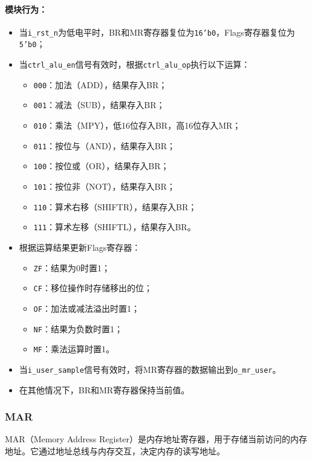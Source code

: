 \documentclass[lang=cn,a4paper,newtx]{elegantpaper}
\begin{document}
\paragraph{模块行为：}
\begin{itemize}
  \item 当\texttt{i\_rst\_n}为低电平时，BR和MR寄存器复位为\texttt{16'b0}，Flags寄存器复位为\texttt{5'b0}；
  \item 当\texttt{ctrl\_alu\_en}信号有效时，根据\texttt{ctrl\_alu\_op}执行以下运算：
    \begin{itemize}
      \item \texttt{000}：加法（ADD），结果存入BR；
      \item \texttt{001}：减法（SUB），结果存入BR；
      \item \texttt{010}：乘法（MPY），低16位存入BR，高16位存入MR；
      \item \texttt{011}：按位与（AND），结果存入BR；
      \item \texttt{100}：按位或（OR），结果存入BR；
      \item \texttt{101}：按位非（NOT），结果存入BR；
      \item \texttt{110}：算术右移（SHIFTR），结果存入BR；
      \item \texttt{111}：算术左移（SHIFTL），结果存入BR。
    \end{itemize}
  \item 根据运算结果更新Flags寄存器：
    \begin{itemize}
      \item \texttt{ZF}：结果为0时置1；
      \item \texttt{CF}：移位操作时存储移出的位；
      \item \texttt{OF}：加法或减法溢出时置1；
      \item \texttt{NF}：结果为负数时置1；
      \item \texttt{MF}：乘法运算时置1。
    \end{itemize}
  \item 当\texttt{i\_user\_sample}信号有效时，将MR寄存器的数据输出到\texttt{o\_mr\_user}。
  \item 在其他情况下，BR和MR寄存器保持当前值。
\end{itemize}

\subsubsection{MAR}
MAR（Memory Address Register）是内存地址寄存器，用于存储当前访问的内存地址。它通过地址总线与内存交互，决定内存的读写地址。
\end{document}
